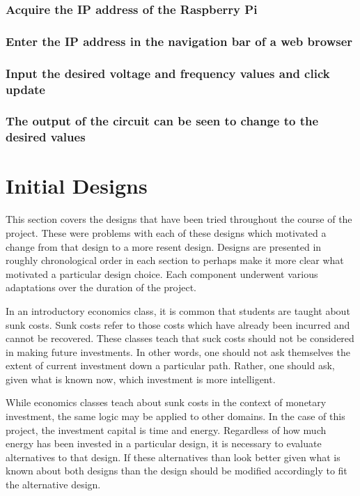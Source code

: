 \documentclass{article}	%
\begin{document}
\begin{multicols}{2}
\subsubsection{Acquire the IP address of the Raspberry Pi}

\subsubsection{Enter the IP address in the navigation bar of a web browser}

\subsubsection{Input the desired voltage and frequency values and click update}

\subsubsection{The output of the circuit can be seen to change to the desired values}

\newpage
\section{Initial Designs}
This section covers the designs that have been tried
throughout the course of the project. 
These were problems with each of these designs
which motivated a change from that design to
a more resent design.
Designs are presented in roughly chronological order in each section
to perhaps make it more clear what motivated
a particular design choice.
Each component underwent various adaptations 
over the duration of the project.

In an introductory economics class,
it is common that students are taught about sunk costs.
Sunk costs refer to those costs which
have already been incurred and
cannot be recovered.
These classes teach that suck costs should not
be considered in making future investments.
In other words,
one should not ask themselves the extent of 
current investment down a particular path.
Rather, one should ask,
given what is known now,
which investment is more intelligent.

While economics classes teach about sunk costs in
the context of monetary investment,
the same logic may be applied to other domains.
In the case of this project,
the investment capital is time and energy.
Regardless of how much energy has been invested
in a particular design,
it is necessary to evaluate alternatives to that design.
If these alternatives than look better
given what is known about both designs
than the design should be modified accordingly
to fit the alternative design.


\end{multicols}
\end{document}

